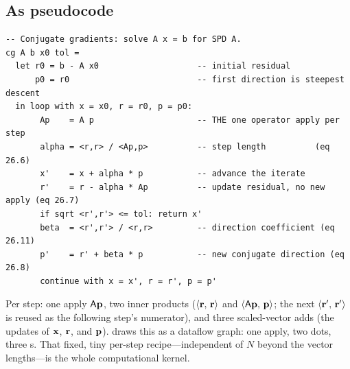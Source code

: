 \subsection{As pseudocode}

\begin{lstlisting}[style=l4style]
-- Conjugate gradients: solve A x = b for SPD A.
cg A b x0 tol =
  let r0 = b - A x0                    -- initial residual
      p0 = r0                          -- first direction is steepest descent
  in loop with x = x0, r = r0, p = p0:
       Ap    = A p                     -- THE one operator apply per step
       alpha = <r,r> / <Ap,p>          -- step length          (eq 26.6)
       x'    = x + alpha * p           -- advance the iterate
       r'    = r - alpha * Ap          -- update residual, no new apply (eq 26.7)
       if sqrt <r',r'> <= tol: return x'
       beta  = <r',r'> / <r,r>         -- direction coefficient (eq 26.11)
       p'    = r' + beta * p           -- new conjugate direction (eq 26.8)
       continue with x = x', r = r', p = p'
\end{lstlisting}

Per step: one apply $\mathsf{A}\mathbf{p}$, two inner products ($\left\langle \mathbf{r},\, \mathbf{r}\right\rangle$ and
$\left\langle \mathsf{A}\mathbf{p},\, \mathbf{p}\right\rangle$; the next $\left\langle \mathbf{r}',\, \mathbf{r}'\right\rangle$ is reused as the
following step's numerator), and three scaled-vector adds (the updates of $\mathbf{x}$,
$\mathbf{r}$, and $\mathbf{p}$).  draws this as a dataflow graph: one apply,
two dots, three s. That fixed, tiny per-step recipe---independent of
$N$ beyond the vector lengths---is the whole computational kernel.

